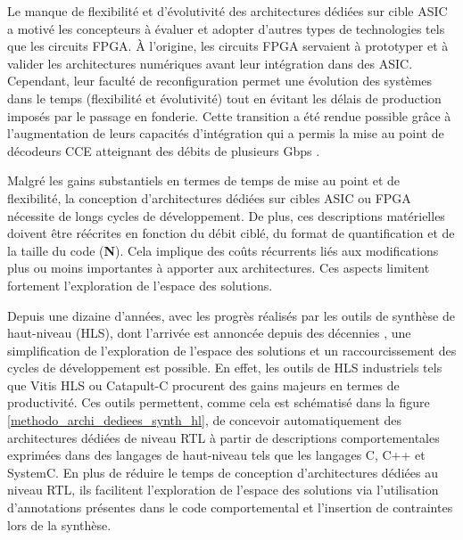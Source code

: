 \documentclass[../main.tex]{subfiles}
\begin{document}
Le manque de flexibilité et d’évolutivité des architectures dédiées sur cible ASIC a motivé les concepteurs à évaluer et adopter d’autres types de technologies tels que les circuits FPGA. À l’origine, les circuits FPGA servaient à prototyper et à valider les architectures numériques avant leur intégration dans des ASIC. Cependant, leur faculté de reconfiguration permet une évolution des systèmes dans le temps (flexibilité et évolutivité) tout en évitant les délais de production imposés par le passage en fonderie. Cette transition a été rendue possible grâce à l’augmentation de leurs capacités d’intégration qui a permis la mise au point de décodeurs CCE atteignant des débits de plusieurs Gbps \cite{PIGNOLY:MS,BOUTILLON,Wei18}.



Malgré les gains substantiels en termes de temps de mise au point et de flexibilité, la conception d’architectures dédiées sur cibles ASIC ou FPGA nécessite de longs cycles de développement. De plus, ces descriptions matérielles doivent être réécrites en fonction du débit ciblé, du format de quantification et de la taille du code (\textbf{N}). Cela implique des coûts récurrents liés aux modifications plus ou moins importantes à apporter aux architectures. Ces aspects limitent fortement l’exploration de l’espace des solutions. 


Depuis une dizaine d’années, avec les progrès réalisés par les outils de synthèse de haut-niveau (HLS), dont l’arrivée est annoncée depuis des décennies \cite{HLS1, HLS2, HLS3}, une simplification de l’exploration de l’espace des solutions et un raccourcissement des cycles de développement est possible. En effet, les outils de HLS industriels tels que Vitis HLS \cite{Vitis} ou Catapult-C \cite{catapult_c} procurent des gains majeurs en termes de productivité. Ces outils permettent, comme cela est schématisé dans la figure \ref{methodo_archi_dediees_synth_hl}, de concevoir automatiquement des architectures dédiées de niveau RTL à partir de descriptions comportementales exprimées dans des langages de haut-niveau tels que les langages C, C++ et SystemC. En plus de réduire le temps de conception d’architectures dédiées au niveau RTL, ils facilitent l’exploration de l’espace des solutions via l'utilisation d’annotations présentes dans le code comportemental et l'insertion de contraintes lors de la synthèse. 
\end{document}
